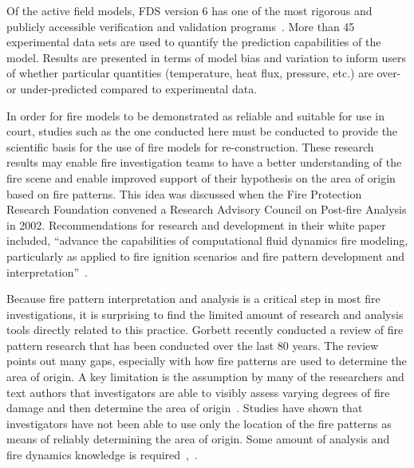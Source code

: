 \documentclass[twoside]{uocthesis}
\begin{document}
Of the active field models, FDS version 6 has one of the most rigorous and publicly accessible verification and validation programs~\cite{FDS_Verification_Guide,FDS_Validation_Guide}. More than 45 experimental data sets are used to quantify the prediction capabilities of the model.  Results are presented in terms of model bias and variation to inform users of whether particular quantities (temperature, heat flux, pressure, etc.) are over- or under-predicted compared to experimental data.

In order for fire models to be demonstrated as reliable and suitable for use in court, studies such as the one conducted here must be conducted to provide the scientific basis for the use of fire models for re-construction.  These research results may enable fire investigation teams to have a better understanding of the fire scene and enable improved support of their hypothesis on the area of origin based on fire patterns.  This idea was discussed when the Fire Protection Research Foundation convened a Research Advisory Council on Post-fire Analysis in 2002.  Recommendations for research and development in their white paper included, ``advance the capabilities of computational fluid dynamics fire modeling, particularly as applied to fire ignition scenarios and fire pattern development and interpretation''~\cite{RAC:2002}.

Because fire pattern interpretation and analysis is a critical step in most fire investigations, it is surprising to find the limited amount of research and analysis tools directly related to this practice.  Gorbett recently conducted a review of fire pattern research that has been conducted over the last 80 years. The review points out many gaps, especially with how fire patterns are used to determine the area of origin.  A key limitation is the assumption by many of the researchers and text authors that investigators are able to visibly assess varying degrees of fire damage and then determine the area of origin~\cite{Gorbett_2015}. Studies have shown that investigators have not been able to use only the location of the fire patterns as means of reliably determining the area of origin.  Some amount of analysis and fire dynamics knowledge is required~\cite{Carmen_2008},~\cite{Tinsley_2013}.      
\end{document}
